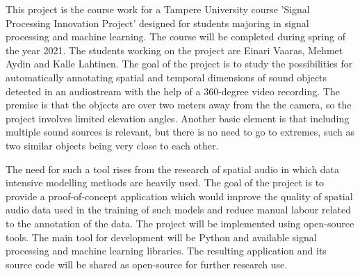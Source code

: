 This project is the course work for a Tampere University course 'Signal Processing Innovation Project' designed for students majoring in signal processing and machine learning. The course will be completed during spring of the year 2021. The students working on the project are Einari Vaaras, Mehmet Aydin and Kalle Lahtinen. The goal of the project is to study the possibilities for automatically annotating spatial and temporal dimensions of sound objects detected in an audiostream with the help of a 360-degree video recording. The premise is that the objects are over two meters away from the the camera, so the project involves limited elevation angles. Another basic element is that including multiple sound sources is relevant, but there is no need to go to extremes, such as two similar objects being very close to each other.

The need for such a tool rises from the research of spatial audio in which data intensive modelling methods are heavily used. The goal of the project is to provide a proof-of-concept application which would improve the quality of spatial audio data used in the training of such models and reduce manual labour related to the annotation of the data. The project will be implemented using open-source tools. The main tool for development will be Python and available signal processing and machine learning libraries. The resulting application and its source code will be shared as open-source for further research use.

